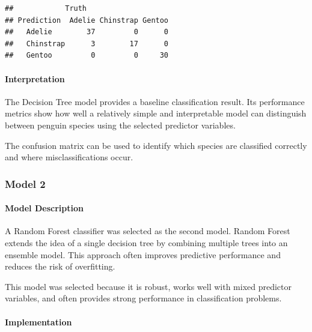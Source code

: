 \documentclass[
]{article}
\begin{document}
\begin{verbatim}
##            Truth
## Prediction  Adelie Chinstrap Gentoo
##   Adelie        37         0      0
##   Chinstrap      3        17      0
##   Gentoo         0         0     30
\end{verbatim}

\paragraph{Interpretation}\label{interpretation-4}

The Decision Tree model provides a baseline classification result. Its
performance metrics show how well a relatively simple and interpretable
model can distinguish between penguin species using the selected
predictor variables.

The confusion matrix can be used to identify which species are
classified correctly and where misclassifications occur.

\subsubsection{Model 2}\label{model-2}

\paragraph{Model Description}\label{model-description-1}

A Random Forest classifier was selected as the second model. Random
Forest extends the idea of a single decision tree by combining multiple
trees into an ensemble model. This approach often improves predictive
performance and reduces the risk of overfitting.

This model was selected because it is robust, works well with mixed
predictor variables, and often provides strong performance in
classification problems.

\paragraph{Implementation}\label{implementation-1}
\end{document}
